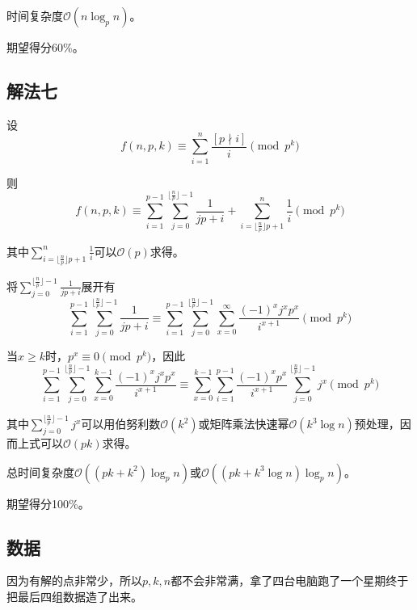 \documentclass{article}
\begin{document}
时间复杂度$\mathcal{O}(n \log_p n)$。

期望得分60\%。

\subsection*{解法七}

设\[f(n,p,k) \equiv \sum_{i=1}^n \frac{[p \nmid i]}{i} \pmod{p^k}\]

则\[f(n,p,k) \equiv \sum_{i=1}^{p-1} \sum_{j=0}^{\lfloor \frac{n}{p} \rfloor -1} \frac{1}{jp+i} + \sum_{i=\lfloor \frac{n}{p} \rfloor p+1}^n \frac{1}{i} \pmod{p^k}\]

其中$\sum_{i=\lfloor \frac{n}{p} \rfloor p+1}^n \frac{1}{i}$可以$\mathcal{O}(p)$求得。

将$\sum_{j=0}^{\lfloor \frac{n}{p} \rfloor -1} \frac{1}{jp+i}$展开有
\[
\sum_{i=1}^{p-1} \sum_{j=0}^{\lfloor \frac{n}{p} \rfloor -1} \frac{1}{jp+i}
\equiv \sum_{i=1}^{p-1} \sum_{j=0}^{\lfloor \frac{n}{p} \rfloor -1} \sum_{x=0}^{\infty} \frac{(-1)^x j^x p^x}{i^{x+1}} \pmod{p^k}
\]

当$x \geq k$时，$p^x \equiv 0 \pmod{p^k}$，因此
\[
\sum_{i=1}^{p-1} \sum_{j=0}^{\lfloor \frac{n}{p} \rfloor -1} \sum_{x=0}^{k-1} \frac{(-1)^x j^x p^x}{i^{x+1}}
\equiv
\sum_{x=0}^{k-1} \sum_{i=1}^{p-1} \frac{(-1)^x p^x}{i^{x+1}} \sum_{j=0}^{\lfloor \frac{n}{p} \rfloor -1} j^x \pmod{p^k}
\]

其中$\sum_{j=0}^{\lfloor \frac{n}{p} \rfloor -1} j^x$可以用伯努利数$\mathcal{O}(k^2)$或矩阵乘法快速幂$\mathcal{O}(k^3 \log n)$预处理，因而上式可以$\mathcal{O}(pk)$求得。

总时间复杂度$\mathcal{O}((pk + k^2) \log_p n)$或$\mathcal{O}((pk+k^3 \log n) \log_p n)$。

期望得分100\%。

\subsection*{数据}

因为有解的点非常少，所以$p,k,n$都不会非常满，拿了四台电脑跑了一个星期终于把最后四组数据造了出来。
\end{document}
